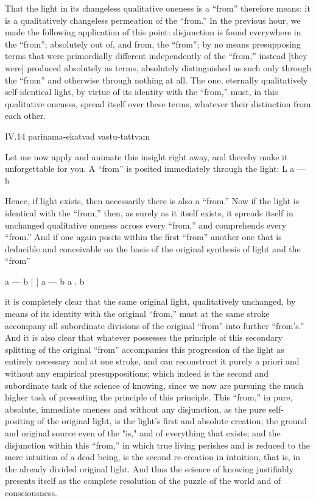 That the light in its changeless qualitative oneness
is a “from” therefore means:
it is a qualitatively changeless
permeation of the “from.”
In the previous hour,
we made the following application of this point:
disjunction is found everywhere in the “from”;
absolutely out of, and from, the “from”;
by no means presupposing terms
that were primordially different
independently of the “from,”
instead [they were] produced absolutely as terms,
absolutely distinguished as such
only through the “from”
and otherwise through nothing at all.
The one, eternally qualitatively self-identical light,
by virtue of its identity with the “from,”
must, in this qualitative oneness,
spread itself over these terms,
whatever their distinction from each other.

IV.14
parinama-ekatvad vastu-tattvam

Let me now apply and animate this insight right away,
and thereby make it unforgettable for you.
A “from” is posited immediately through the light:
L
a — b

Hence, if light exists,
then necessarily there is also a “from.”
Now if the light is identical with the “from,”
then, as surely as it itself exists,
it spreads itself in unchanged qualitative oneness
across every “from,” and comprehends every “from.”
And if one again posits within the first “from”
another one that is deducible and conceivable
on the basis of the original synthesis of
light and the “from”

a — b
|
|
a — b  a . b

it is completely clear that
the same original light, qualitatively unchanged,
by means of its identity with the original “from,”
must at the same stroke accompany
all subordinate divisions of
the original “from” into further “from's.”
And it is also clear that whatever possesses
the principle of this secondary splitting
of the original “from” accompanies
this progression of the light
as entirely necessary and at one stroke,
and can reconstruct it purely a priori
and without any empirical presuppositions;
which indeed is the second and subordinate task
of the science of knowing,
since we now are pursuing the much higher task
of presenting the principle of this principle.
This “from,” in pure, absolute, immediate oneness
and without any disjunction,
as the pure self-positing of the original light,
is the light's first and absolute creation;
the ground and original source even of the "is,"
and of everything that exists;
and the disjunction within this “from,”
in which true living perishes
and is reduced to the mere intuition of a dead being,
is the second re-creation in intuition,
that is, in the already divided original light.
And thus the science of knowing
justifiably presents itself
as the complete resolution of
the puzzle of the world
and of consciousness.

